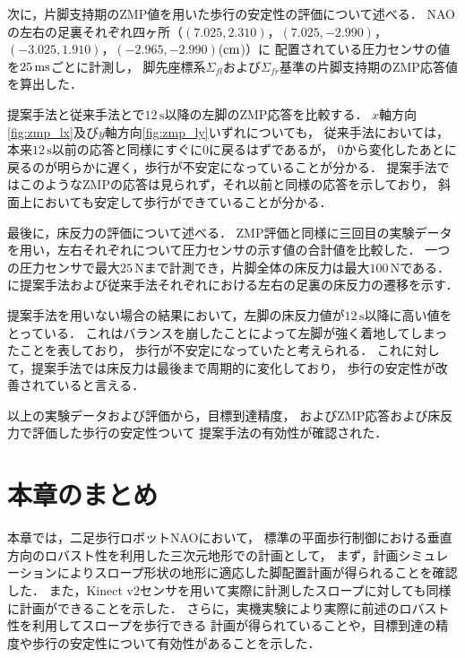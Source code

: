 \documentclass[autodetect-engine,dvipdfmx-if-dvi,ja=standard,a4j,jbase=11pt,magstyle=nomag*]{bxjsreport}
\begin{document}




次に，片脚支持期のZMP値を用いた歩行の安定性の評価について述べる．
NAOの左右の足裏それぞれ四ヶ所（$(7.025, 2.310)$，$(7.025, -2.990)$，$(-3.025, 1.910)$，$(-2.965, -2.990)$($\si{\centi\meter}$)）に
配置されている圧力センサの値を$25\,\si{\milli\second}$ごとに計測し，
脚先座標系$\Sigma_{fl}$および$\Sigma_{fr}$基準の片脚支持期のZMP応答値を算出した．

提案手法と従来手法とで$12\,\mathrm{s}$以降の左脚のZMP応答を比較する．
$x$軸方向\cref{fig:zmp_lx}及び$y$軸方向\cref{fig:zmp_ly}いずれについても，
従来手法においては，本来$12\,\mathrm{s}$以前の応答と同様にすぐに$0$に戻るはずであるが，
$0$から変化したあとに戻るのが明らかに遅く，歩行が不安定になっていることが分かる．
提案手法ではこのようなZMPの応答は見られず，それ以前と同様の応答を示しており，
斜面上においても安定して歩行ができていることが分かる．


最後に，床反力の評価について述べる．
ZMP評価と同様に三回目の実験データを用い，左右それぞれについて圧力センサの示す値の合計値を比較した．
一つの圧力センサで最大$25 \,\mathrm{N}$まで計測でき，片脚全体の床反力は最大$100 \,\mathrm{N}$である．
に提案手法および従来手法それぞれにおける左右の足裏の床反力の遷移を示す．

提案手法を用いない場合の結果において，左脚の床反力値が$12\,\mathrm{s}$以降に高い値をとっている．
これはバランスを崩したことによって左脚が強く着地してしまったことを表しており，
歩行が不安定になっていたと考えられる．
これに対して，提案手法では床反力は最後まで周期的に変化しており，
歩行の安定性が改善されていると言える．

以上の実験データおよび評価から，目標到達精度，
およびZMP応答および床反力で評価した歩行の安定性ついて
提案手法の有効性が確認された．


\section{本章のまとめ}
本章では，二足歩行ロボットNAOにおいて，
標準の平面歩行制御における垂直方向のロバスト性を利用した三次元地形での計画として，
まず，計画シミュレーションによりスロープ形状の地形に適応した脚配置計画が得られることを確認した．
また，Kinect v2センサを用いて実際に計測したスロープに対しても同様に計画ができることを示した．
さらに，実機実験により実際に前述のロバスト性を利用してスロープを歩行できる
計画が得られていることや，目標到達の精度や歩行の安定性について有効性があることを示した．
\end{document}
